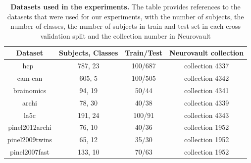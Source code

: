 \begin{table}
\begin{center}
\begin{tabular}{c|c|c|c}
\hline
Dataset & Subjects, Classes  & Train/Test & Neurovault collection 
\\ \hline
hcp~\cite{van2013wu}  & 787, 23 & 100/687  & collection 4337
\\
cam-can \cite{shafto2014cambridge}  & 605, 5 & 100/505  & collection 4342
\\
brainomics \cite{orfanos2017brainomics}  & 94, 19 & 50/44  &  collection 4341
\\
archi \cite{pinel2019functional}  & 78, 30 & 40/38  & collection 4339
\\
la5c \cite{poldrack2016phenome}  & 191, 24 & 100/91  & collection 4343
\\
pinel2012archi \cite{pinel2019functional} & 76, 10 & 40/36  & collection 1952
\\
pinel2009twins \cite{pinel2013genetic}  & 65, 12 & 35/30  & collection 1952
\\
pinel2007fast \cite{pinel2007fast} & 133, 10 & 70/63  & collection 1952
\\\hline\hline
\end{tabular}
\end{center}
\caption{\textbf{Datasets used in the experiments.} The table provides
  references to the datasets that were used for our experiments, with
  the number of subjects, the number of classes, the number of subjects in train
  and test set in each cross validation split and the collection number in Neurovault}
  \label{app:dataset:tab}
\end{table}

